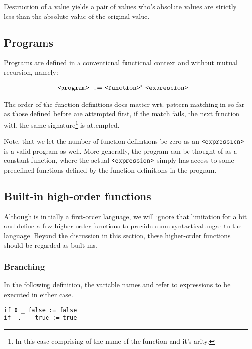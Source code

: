 \begin{lemma} Destruction of a value yields a pair of values who's absolute
values are strictly less than the absolute value of the original
value.\end{lemma}

\subsection{Programs}

Programs are defined in a conventional functional context and without mutual
recursion, namely:

\begin{align}
\text{{\ttfamily<program>}}\ ::=&\ \text{{\ttfamily<function>}}^*\ \text{{\ttfamily<expression>}}
\end{align}

The order of the function definitions does matter wrt. pattern matching in so
far as those defined before are attempted first, if the match fails, the next
function with the same signature\footnote{In this case comprising of the name
of the function and it's arity.} is attempted.

Note, that we let the number of function definitions be zero as an
$\text{{\ttfamily<expression>}}$ is a valid program as well. More generally, the program
can be thought of as a constant function, where the actual
$\text{{\ttfamily<expression>}}$ simply has access to some predefined functions defined
by the function definitions in the program.

\subsection{Built-in high-order functions}

Although  is initially a first-order language, we will ignore that
limitation for a bit and define a few higher-order functions to provide some
syntactical sugar to the language. Beyond the discussion in this section, these
higher-order functions should be regarded as  built-ins.

\subsubsection{Branching}

In the following definition, the variable names  and 
refer to expressions to be executed in either case.

\begin{verbatim}
if 0 _ false := false
if _._ _ true := true
\end{verbatim}

